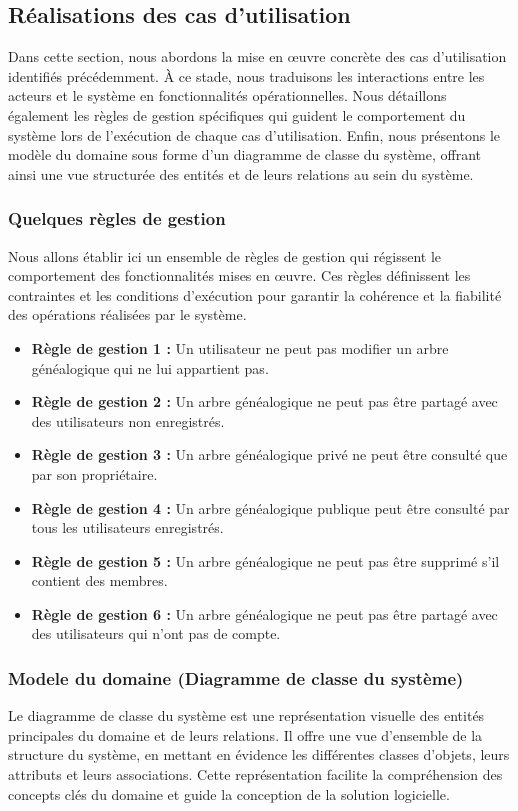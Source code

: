 \newpage
\subsection{Réalisations des cas d'utilisation}
Dans cette section, nous abordons la mise en œuvre concrète des cas
d’utilisation identifiés précédemment. À ce stade, nous traduisons les
interactions entre les acteurs et le système en fonctionnalités opérationnelles.
Nous détaillons également les règles de gestion spécifiques qui guident le
comportement du système lors de l’exécution de chaque cas d’utilisation. Enfin,
nous présentons le modèle du domaine sous forme d’un diagramme de classe du
système, offrant ainsi une vue structurée des entités et de leurs relations
au sein du système.
\subsubsection{Quelques règles de gestion}

Nous allons établir ici un ensemble de règles de gestion qui régissent le
comportement des fonctionnalités mises en œuvre. Ces règles définissent les
contraintes et les conditions d’exécution pour garantir la cohérence et la
fiabilité des opérations réalisées par le système.

\begin{itemize}
  \item \textbf{Règle de gestion 1 :} Un utilisateur ne peut pas modifier un arbre généalogique qui ne lui appartient pas.
  \item \textbf{Règle de gestion 2 :} Un arbre généalogique ne peut pas être partagé avec des utilisateurs non enregistrés.
  \item \textbf{Règle de gestion 3 :} Un arbre généalogique privé ne peut être consulté que par son propriétaire.
  \item \textbf{Règle de gestion 4 :} Un arbre généalogique publique peut être consulté par tous les utilisateurs enregistrés.
  \item \textbf{Règle de gestion 5 :} Un arbre généalogique ne peut pas être supprimé s’il contient des membres.
  \item \textbf{Règle de gestion 6 :} Un arbre généalogique ne peut pas être partagé avec des utilisateurs qui n’ont pas de compte.
\end{itemize}

\subsubsection{Modele du domaine (Diagramme de classe du système)}
Le diagramme de classe du système est une représentation visuelle des
entités principales du domaine et de leurs relations. Il offre une vue
d'ensemble de la structure du système, en mettant en évidence les différentes
classes d'objets, leurs attributs et leurs associations. Cette représentation
facilite la compréhension des concepts clés du domaine et guide la conception
de la solution logicielle.


